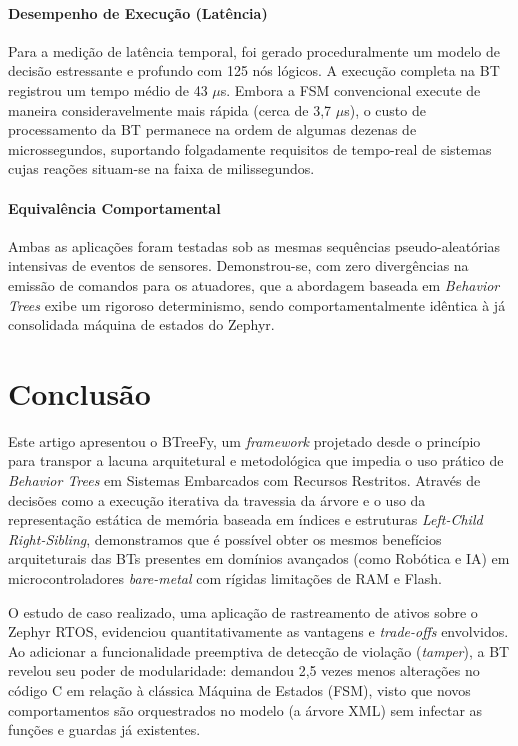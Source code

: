 \documentclass[conference]{IEEEtran}
\begin{document}
\paragraph{\textbf{Desempenho de Execução (Latência)}}
Para a medição de latência temporal, foi gerado proceduralmente um modelo de decisão estressante e profundo com 125 nós lógicos. A execução completa na BT registrou um tempo médio de 43 $\mu$s. Embora a FSM convencional execute de maneira consideravelmente mais rápida (cerca de 3,7 $\mu$s), o custo de processamento da BT permanece na ordem de algumas dezenas de microssegundos, suportando folgadamente requisitos de tempo-real de sistemas cujas reações situam-se na faixa de milissegundos.

\paragraph{\textbf{Equivalência Comportamental}} 
Ambas as aplicações foram testadas sob as mesmas sequências pseudo-aleatórias intensivas de eventos de sensores. Demonstrou-se, com zero divergências na emissão de comandos para os atuadores, que a abordagem baseada em \textit{Behavior Trees} exibe um rigoroso determinismo, sendo comportamentalmente idêntica à já consolidada máquina de estados do Zephyr.

\section{Conclusão}

Este artigo apresentou o BTreeFy, um \textit{framework} projetado desde o princípio para transpor a lacuna arquitetural e metodológica que impedia o uso prático de \textit{Behavior Trees} em Sistemas Embarcados com Recursos Restritos. Através de decisões como a execução iterativa da travessia da árvore e o uso da representação estática de memória baseada em índices e estruturas \textit{Left-Child Right-Sibling}, demonstramos que é possível obter os mesmos benefícios arquiteturais das BTs presentes em domínios avançados (como Robótica e IA) em microcontroladores \textit{bare-metal} com rígidas limitações de RAM e Flash.

O estudo de caso realizado, uma aplicação de rastreamento de ativos sobre o Zephyr RTOS, evidenciou quantitativamente as vantagens e \textit{trade-offs} envolvidos. Ao adicionar a funcionalidade preemptiva de detecção de violação (\textit{tamper}), a BT revelou seu poder de modularidade: demandou 2,5 vezes menos alterações no código C em relação à clássica Máquina de Estados (FSM), visto que novos comportamentos são orquestrados no modelo (a árvore XML) sem infectar as funções e guardas já existentes. 
\end{document}
